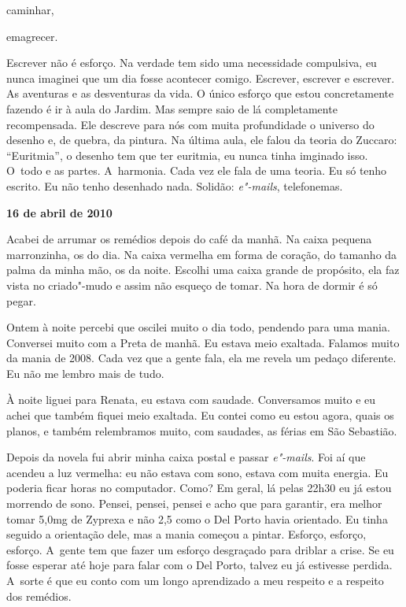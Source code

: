 caminhar,

emagrecer.

Escrever não é esforço. Na verdade tem sido uma necessidade compulsiva,
eu nunca imaginei que um dia fosse acontecer comigo. Escrever, escrever
e escrever. As aventuras e as desventuras da vida. O único esforço que
estou concretamente fazendo é ir à aula do Jardim. Mas sempre saio de lá
completamente recompensada. Ele descreve para nós com muita profundidade
o universo do desenho e, de quebra, da pintura. Na última aula, ele
falou da teoria do Zuccaro: ``Euritmia'', o desenho tem que ter
euritmia, eu nunca tinha imginado isso. O~todo e as partes. A~harmonia.
Cada vez ele fala de uma teoria. Eu só tenho escrito. Eu não tenho
desenhado nada. Solidão: \emph{e"-mails}, telefonemas.

\begin{center}\asterisc{}\end{center}
 \begin{flushright}\textbf{16 de abril de 2010}\end{flushright}


Acabei de arrumar os remédios depois do café da manhã. Na caixa pequena
marronzinha, os do dia. Na caixa vermelha em forma de coração, do
tamanho da palma da minha mão, os da noite. Escolhi uma caixa grande de
propósito, ela faz vista no criado"-mudo e assim não esqueço de tomar. Na
hora de dormir é só pegar.

Ontem à noite percebi que oscilei muito o dia todo, pendendo para uma
mania. Conversei muito com a Preta de manhã. Eu estava meio exaltada.
Falamos muito da mania de 2008. Cada vez que a gente fala, ela me revela
um pedaço diferente. Eu não me lembro mais de tudo.

À noite liguei para Renata, eu estava com saudade. Conversamos muito e
eu achei que também fiquei meio exaltada. Eu contei como eu estou agora,
quais os planos, e também relembramos muito, com saudades, as férias em
São Sebastião.

Depois da novela fui abrir minha caixa postal e passar \emph{e"-mails}.
Foi aí que acendeu a luz vermelha: eu não estava com sono, estava com
muita energia. Eu poderia ficar horas no computador. Como? Em geral,
lá pelas 22h30 eu já estou morrendo de sono. Pensei, pensei, pensei e
acho que para garantir, era melhor tomar 5,0mg de Zyprexa e não 2,5 como
o Del Porto havia orientado. Eu tinha seguido a orientação dele, mas a
mania começou a pintar. Esforço, esforço, esforço. A~gente tem que fazer
um esforço desgraçado para driblar a crise. Se eu fosse esperar até hoje
para falar com o Del Porto, talvez eu já estivesse perdida. A~sorte é
que eu conto com um longo aprendizado a meu respeito e a respeito dos
remédios.

